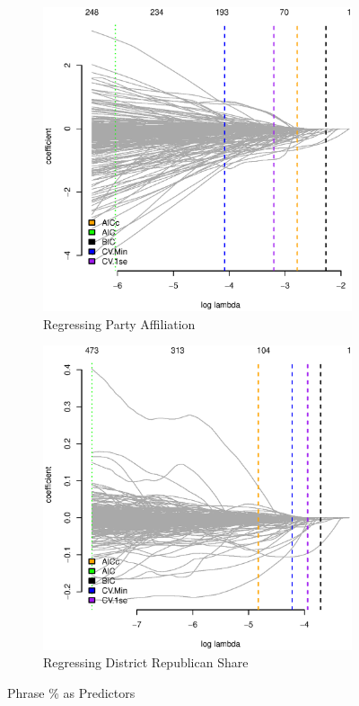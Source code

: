 \documentclass[11pt, fleqn]{article}
\begin{document}
\begin{figure}
  \centering
  \begin{subfigure}[b]{0.49\textwidth}
    \includegraphics[width=\textwidth]{reg_phrase_pcnt.eps}
    \caption{Regressing Party Affiliation}
    \label{fig:pcnt_rep}
  \end{subfigure}
  \hfill
  \begin{subfigure}[b]{0.49\textwidth}
    \includegraphics[width=\textwidth]{reg_phrase_pcnt_repshare.eps}
    \caption{Regressing District Republican Share}
    \label{fig:pcnt_rep_share}
  \end{subfigure}
  \caption{Phrase \% as Predictors}
\end{figure}
\end{document}
